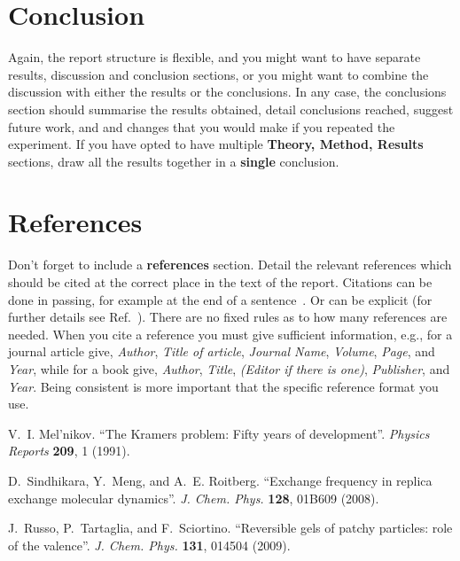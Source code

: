 \documentclass[a4paper,12pt]{article}
\begin{document}
 
\section{Conclusion}

Again, the report structure is flexible, and you might want to have separate
results, discussion and conclusion sections, or you might want to combine
the discussion with either the results or the conclusions. In any case, the 
conclusions section should summarise the results obtained, detail
conclusions reached, suggest future work, and and changes that you would make 
if you repeated the experiment. 
If you have opted to have multiple {\bf Theory, Method, Results}
sections, draw all the results together in a {\bf single} conclusion.

\section{References}

Don't forget to include a \textbf{references} section. Detail the relevant 
references which should be cited at the correct place in the text of the 
report. Citations can be done in passing, for example at the end of a 
sentence~\cite{mel1991}. Or can be explicit (for further details see 
Ref.~\cite{sindhikara2008}). There are no fixed rules as to how many 
references are needed. 
When you cite a reference you must give sufficient information, e.g., for a journal article give, {\it Author}, {\it Title of
article},
{\it Journal Name}, {\it Volume}, {\it Page}, and {\it Year}, 
while for a book give, {\it Author}, {\it Title},
{\it (Editor if there is one)}, {\it Publisher}, and {\it Year}.  
Being consistent is more important that the specific reference format
you use.

\begingroup
\renewcommand{\section}[2]{}  %

\begin{thebibliography}{10}
V.~I. Mel'nikov. ``The Kramers problem: Fifty years of development''.
\textit{Physics Reports} \textbf{209}, 1 (1991).

D.~Sindhikara, Y.~Meng, and A.~E. Roitberg.
``Exchange frequency in replica exchange molecular dynamics''.
\textit{J. Chem. Phys.} \textbf{128}, 01B609 (2008).

J.~Russo, P.~Tartaglia, and F.~Sciortino.
``Reversible gels of patchy particles: role of the valence''.
\textit{J. Chem. Phys.} \textbf{131}, 014504 (2009).
\end{thebibliography}
\end{document}
